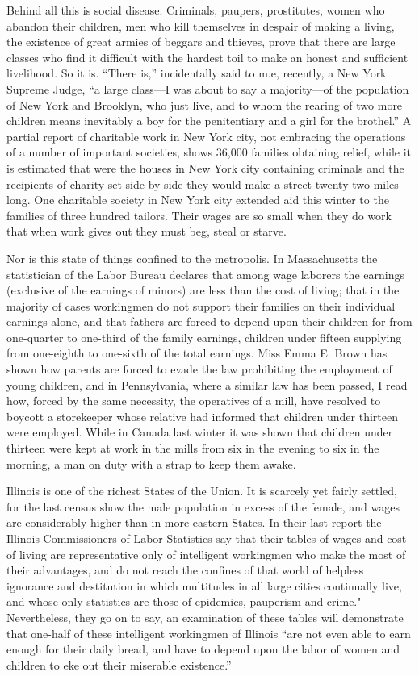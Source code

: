 \documentclass{book}
\begin{document}
Behind all this is social disease. Criminals, paupers, prostitutes, women who abandon their children, men who kill themselves in despair of making a living, the existence of great armies of beggars and thieves, prove that there are large classes who find it difficult with the hardest toil to make an honest and sufficient livelihood. So it is. “There is,” incidentally said to m.e, recently, a New York Supreme Judge, “a large class—I was about to say a majority—of the population of New York and Brooklyn, who just live, and to whom the rearing of two more children means inevitably a boy for the penitentiary and a girl for the brothel.” A partial report of charitable work in New York city, not embracing the operations of a number of important societies, shows 36,000 families obtaining relief, while it is estimated that were the houses in New York city containing criminals and the recipients of charity set side by side they would make a street twenty-two miles long. One charitable society in New York city extended aid this winter to the families of three hundred tailors. Their wages are so small when they do work that when work gives out they must beg, steal or starve.

Nor is this state of things confined to the metropolis. In Massachusetts the statistician of the Labor Bureau declares that among wage laborers the earnings (exclusive of the earnings of minors) are less than the cost of living; that in the majority of cases workingmen do not support their families on their individual earnings alone, and that fathers are forced to depend upon their children for from one-quarter to one-third of the family earnings, children under fifteen supplying from one-eighth to one-sixth of the total earnings. Miss Emma E. Brown has shown how parents are forced to evade the law prohibiting the employment of young children, and in Pennsylvania, where a similar law has been passed, I read how, forced by the same necessity, the operatives of a mill, have resolved to boycott a storekeeper whose relative had informed that children under thirteen were employed. While in Canada last winter it was shown that children under thirteen were kept at work in the mills from six in the evening to six in the morning, a man on duty with a strap to keep them awake.

Illinois is one of the richest States of the Union. It is scarcely yet fairly settled, for the last census show the male population in excess of the female, and wages are considerably higher than in more eastern States. In their last report the Illinois Commissioners of Labor Statistics say that their tables of wages and cost of living are representative only of intelligent workingmen who make the most of their advantages, and do not reach the confines of that world of helpless ignorance and destitution in which multitudes in all large cities continually live, and whose only statistics are those of epidemics, pauperism and crime." Nevertheless, they go on to say, an examination of these tables will demonstrate that one-half of these intelligent workingmen of Illinois “are not even able to earn enough for their daily bread, and have to depend upon the labor of women and children to eke out their miserable existence.”
\end{document}
